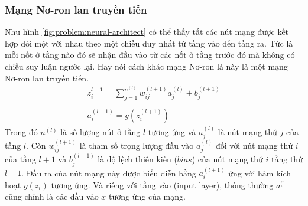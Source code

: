     \subsubsection{Mạng Nơ-ron lan truyền tiến}
    Như hình \ref{fig:problem:neural-architect} có thể thấy tất các nút mạng được kết hợp đôi một với nhau theo một chiều duy nhất từ tầng vào đến tầng ra. Tức là mỗi nốt ở tầng nào đó sẽ nhận đầu vào từ các nốt ở tầng trước đó mà không có chiều suy luận ngước lại. Hay nói cách khác mạng Nơ-ron là này là một mạng Nơ-ron lan truyền tiến. 
    \begin{equation}
      \begin{array}{l}
        z_i^{l+1} = \sum_{j=1}^{n^{(l)}}w_{ij}^{(l+1)}a_j^{(l)} + b_j^{(l+1)} \\
        \\
        a_i^{(l+1)} = g(z_i^{(l+1)})
      \end{array}
    \end{equation}
    Trong đó $n^{(l)}$ là số lượng nút ở tầng $l$ tương ứng và $a_j^{(l)}$ là nút mạng thứ $j$ của tầng $l$. Còn $w_{ij}^{(l+1)}$ là tham số trọng lượng đầu vào $a_j^{(l)}$ đối với nút mạng thứ $i$ của tầng $l+1$ và $b_j^{(l+1)}$ là độ lệch thiên kiến ($bias$) của nút mạng thứ $i$ tầng thứ $l+1$. Đầu ra của nút mạng này được biểu diễn bằng $a_i^{(l+1)}$ ứng với hàm kích hoạt $g(z_i)$ tương ứng. Và riêng với tầng vào (input layer), thông thường $a^{(1}$ cũng chính là các đầu vào $x$ tương ứng của mạng. 
